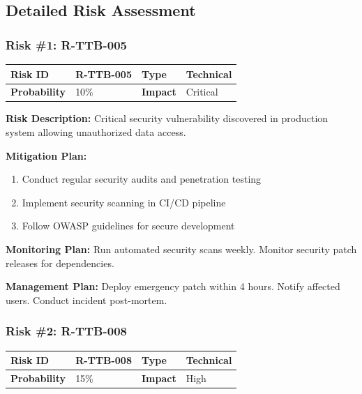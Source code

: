 \subsection{Detailed Risk Assessment}

\subsubsection{Risk \#1: R-TTB-005}

\begin{table}[h]
\small
\begin{tabular}{|p{3cm}|p{3cm}|p{3cm}|p{3cm}|}
\hline
\textbf{Risk ID} & R-TTB-005 & \textbf{Type} & Technical \\
\hline
\textbf{Probability} & 10\% & \textbf{Impact} & Critical \\
\hline
\end{tabular}
\end{table}

\textbf{Risk Description:} Critical security vulnerability discovered in production system allowing unauthorized data access.

\textbf{Mitigation Plan:}
\begin{enumerate}[leftmargin=*]
    \item Conduct regular security audits and penetration testing
    \item Implement security scanning in CI/CD pipeline
    \item Follow OWASP guidelines for secure development
\end{enumerate}

\textbf{Monitoring Plan:} Run automated security scans weekly. Monitor security patch releases for dependencies.

\textbf{Management Plan:} Deploy emergency patch within 4 hours. Notify affected users. Conduct incident post-mortem.

\subsubsection{Risk \#2: R-TTB-008}

\begin{table}[h]
\small
\begin{tabular}{|p{3cm}|p{3cm}|p{3cm}|p{3cm}|}
\hline
\textbf{Risk ID} & R-TTB-008 & \textbf{Type} & Technical \\
\hline
\textbf{Probability} & 15\% & \textbf{Impact} & High \\
\hline
\end{tabular}
\end{table}

